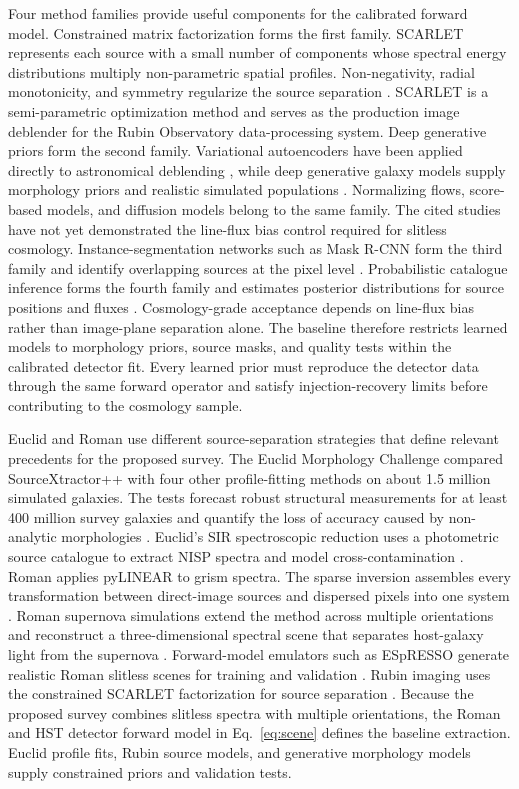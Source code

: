 Four method families provide useful components for the calibrated forward model. Constrained matrix factorization forms the first family. SCARLET represents each source with a small number of components whose spectral energy distributions multiply non-parametric spatial profiles. Non-negativity, radial monotonicity, and symmetry regularize the source separation \cite{scarlet2018}. SCARLET is a semi-parametric optimization method and serves as the production image deblender for the Rubin Observatory data-processing system. Deep generative priors form the second family. Variational autoencoders have been applied directly to astronomical deblending \cite{arcelin2021}, while deep generative galaxy models supply morphology priors and realistic simulated populations \cite{lanusse2021}. Normalizing flows, score-based models, and diffusion models belong to the same family. The cited studies have not yet demonstrated the line-flux bias control required for slitless cosmology. Instance-segmentation networks such as Mask R-CNN form the third family and identify overlapping sources at the pixel level \cite{burke2019}. Probabilistic catalogue inference forms the fourth family and estimates posterior distributions for source positions and fluxes \cite{liu2021}. Cosmology-grade acceptance depends on line-flux bias rather than image-plane separation alone. The baseline therefore restricts learned models to morphology priors, source masks, and quality tests within the calibrated detector fit. Every learned prior must reproduce the detector data through the same forward operator and satisfy injection-recovery limits before contributing to the cosmology sample.

Euclid and Roman use different source-separation strategies that define relevant precedents for the proposed survey. The Euclid Morphology Challenge compared SourceXtractor++ with four other profile-fitting methods on about 1.5 million simulated galaxies. The tests forecast robust structural measurements for at least 400 million survey galaxies and quantify the loss of accuracy caused by non-analytic morphologies \cite{sourcext2020,euclidmorph2023}. Euclid's SIR spectroscopic reduction uses a photometric source catalogue to extract NISP spectra and model cross-contamination \cite{euclidsir2026}. Roman applies pyLINEAR to grism spectra. The sparse inversion assembles every transformation between direct-image sources and dispersed pixels into one system \cite{linear2018,wang2021}. Roman supernova simulations extend the method across multiple orientations and reconstruct a three-dimensional spectral scene that separates host-galaxy light from the supernova \cite{astraatmadja2026}. Forward-model emulators such as ESpRESSO generate realistic Roman slitless scenes for training and validation \cite{espresso2024}. Rubin imaging uses the constrained SCARLET factorization for source separation \cite{scarlet2018}. Because the proposed survey combines slitless spectra with multiple orientations, the Roman and HST detector forward model in Eq.~\eqref{eq:scene} defines the baseline extraction. Euclid profile fits, Rubin source models, and generative morphology models supply constrained priors and validation tests.

